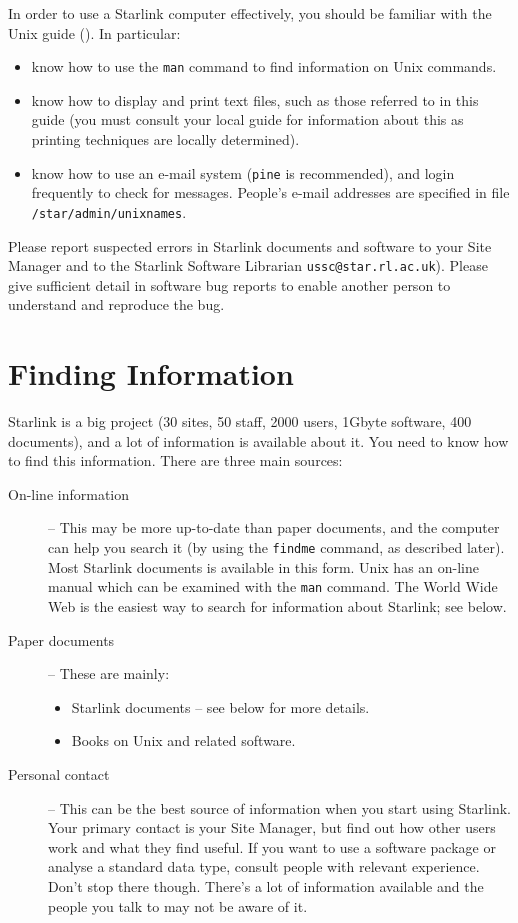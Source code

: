 In order to use a Starlink computer effectively, you should be familiar
with the Unix guide
().
In particular:

\begin{itemize}
\item know how to use the {\tt man} command to find information on Unix
commands.
\item know how to display and print text files, such as those referred to in
this guide (you must consult your local guide for information about this
as printing techniques are locally determined).
\item know how to use an e-mail system ({\tt pine} is recommended), and login
frequently to check for messages.
People's e-mail addresses are specified in file {\tt /star/admin/unixnames}.
\end{itemize}

Please report suspected errors in Starlink documents and software to your Site
Manager and to the Starlink Software Librarian {\tt ussc@star.rl.ac.uk}).
Please give sufficient detail in software bug reports to enable another person
to understand and reproduce the bug.

\newpage

\section{Finding Information}

Starlink is a big project (30 sites, 50 staff, 2000 users, 1Gbyte software,
400 documents), and a lot of information is available about it.
You need to know how to find this information.
There are three main sources:

\begin{description}

\item [On-line information] --
This may be more up-to-date than paper documents, and the computer can help
you search it (by using the {\tt findme} command, as described later).
Most Starlink documents is available in this form.
Unix has an on-line manual which can be examined with the {\tt man} command.
The World Wide Web is the easiest way to search for information about
Starlink; see below.

\item [Paper documents] --
These are mainly:
\begin{itemize}
\item Starlink documents -- see below for more details.
\item Books on Unix and related software.
\end{itemize}

\item [Personal contact] --
This can be the best source of information when you start using Starlink.
Your primary contact is your Site Manager, but find out how other users work
and what they find useful.
If you want to use a software package or analyse a standard data type,
consult people with relevant experience.
Don't stop there though.
There's a lot of information available and the people you talk to may
not be aware of it.
\end{description}

